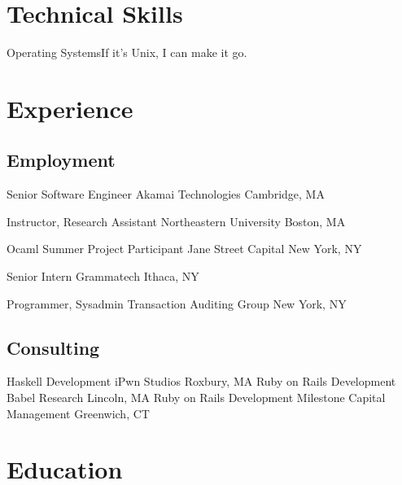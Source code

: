 \documentclass[10pt,letterpaper,sans]{moderncv}
\begin{document}
\makecvtitle

\section{Technical Skills}

             {Operating Systems}{If it's Unix, I can make it go.}


\section{Experience}

\subsection{Employment}

        {Senior Software Engineer}
        {Akamai Technologies}
        {Cambridge, MA}
        {}{}

        {Instructor, Research Assistant}
        {Northeastern University}
        {Boston, MA}
        {}{}

        {Ocaml Summer Project Participant}
        {Jane Street Capital}
        {New York, NY}
        {}{}

        {Senior Intern}
        {Grammatech}
        {Ithaca, NY}
        {}{}

        {Programmer, Sysadmin}
        {Transaction Auditing Group}
        {New York, NY}
        {}{}

\subsection{Consulting}

        {Haskell Development}
        {iPwn Studios}
        {Roxbury, MA}
        {}{}
\cventry{}
        {Ruby on Rails Development}
        {Babel Research}
        {Lincoln, MA}
        {}{}
\cventry{}
        {Ruby on Rails Development}
        {Milestone Capital Management}
        {Greenwich, CT}
        {}{}

\section{Education}
\end{document}
